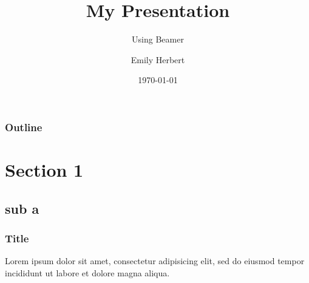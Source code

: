 \documentclass{beamer}
\title{My Presentation}
\subtitle{Using Beamer}
\author{Emily Herbert}
\institute{University of Massachusetts Amherst}
\date{\today}
\begin{document}
\begin{frame}
\titlepage
\end{frame}

\begin{frame}
\frametitle{Outline}
\tableofcontents
\end{frame}

\section{Section 1}
\subsection{sub a}

\begin{frame}
\frametitle{Title}
Lorem ipsum dolor sit amet, consectetur adipisicing elit, sed do eiusmod tempor incididunt ut labore et dolore magna aliqua.
\end{frame}
\end{document}

